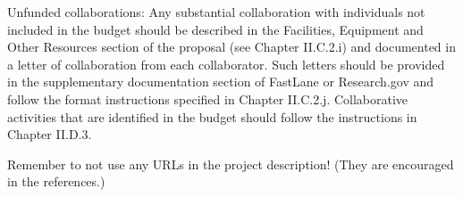 %


Unfunded collaborations: Any substantial collaboration with individuals not included in the budget should be described in the Facilities, Equipment and Other Resources section of the proposal (see Chapter II.C.2.i) and documented in a letter of collaboration from each collaborator. Such letters should be provided in the supplementary documentation section of FastLane or Research.gov and follow the format instructions specified in Chapter II.C.2.j. Collaborative activities that are identified in the budget should follow the instructions in Chapter II.D.3.

Remember to not use any URLs in the project description!  (They are
encouraged in the references.)

